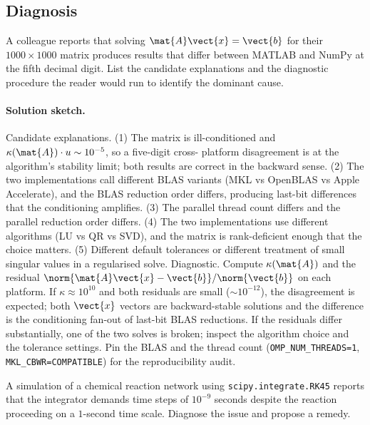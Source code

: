 \subsection*{Diagnosis}

\begin{exercise}
A colleague reports that solving $\mat{A}\vect{x} = \vect{b}$ for
their $1000 \times 1000$ matrix produces results that differ
between MATLAB and NumPy at the fifth decimal digit. List the
candidate explanations and the diagnostic procedure the reader
would run to identify the dominant cause.
\end{exercise}

\paragraph{Solution sketch.}
Candidate explanations. (1) The matrix is ill-conditioned and
$\kappa(\mat{A}) \cdot u \sim 10^{-5}$, so a five-digit cross-
platform disagreement is at the algorithm's stability limit; both
results are correct in the backward sense. (2) The two
implementations call different BLAS variants (MKL vs OpenBLAS vs
Apple Accelerate), and the BLAS reduction order differs, producing
last-bit differences that the conditioning amplifies. (3) The
parallel thread count differs and the parallel reduction order
differs. (4) The two implementations use different algorithms
(LU vs QR vs SVD), and the matrix is rank-deficient enough that
the choice matters. (5) Different default tolerances or different
treatment of small singular values in a regularised solve.
Diagnostic. Compute $\kappa(\mat{A})$ and the residual
$\norm{\mat{A}\vect{x} - \vect{b}}/\norm{\vect{b}}$ on each
platform. If $\kappa \approx 10^{10}$ and both residuals are
small ($\sim 10^{-12}$), the disagreement is expected; both
$\vect{x}$ vectors are backward-stable solutions and the
difference is the conditioning fan-out of last-bit BLAS
reductions. If the residuals differ substantially, one of the
two solves is broken; inspect the algorithm choice and the
tolerance settings. Pin the BLAS and the thread count
(\texttt{OMP\_NUM\_THREADS=1}, \texttt{MKL\_CBWR=COMPATIBLE}) for
the reproducibility audit.

\begin{exercise}
A simulation of a chemical reaction network using
\texttt{scipy.integrate.RK45} reports that the integrator
demands time steps of $10^{-9}$ seconds despite the reaction
proceeding on a $1$-second time scale. Diagnose the issue and
propose a remedy.
\end{exercise}


